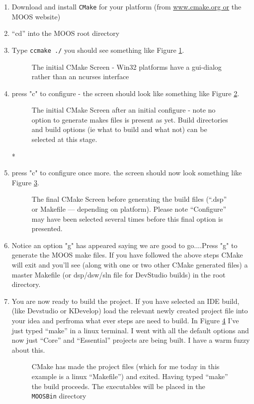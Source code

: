 \documentclass[a4paper,10pt]{article}
\newcommand{\Code}[1]{\texttt{#1} }
\newcommand{\code}[1]{\Code{#1} }
\begin{document}
\begin{enumerate}
\item  Download and install \code{CMake} for your platform (from
\url{www.cmake.org or} the MOOS website)
%
\item ``cd'' into the MOOS root directory
%
\item Type \code{ccmake ./}  you should see
something like Figure \ref{Fig:CMake1}.
\begin{figure}[ht]\label{Fig:CMake1}
\centering {}
\caption{The initial CMake Screen - Win32 platforms have a
gui-dialog rather than an ncurses interface}
\end{figure}
%
\item press "c" to configure - the screen should look like
something like Figure \ref{Fig:CMake2}.
\begin{figure}[ht]\label{Fig:CMake2}
\centering {}
\caption{The initial CMake Screen after an initial configure -
note no option to generate makes files is present as yet. Build
directories and build options (ie what to build and what not) can
be selected at this stage. }
\end{figure}
*
\item press "c" to configure once more. the screen should now look
something like  Figure \ref{Fig:CMake3}.
\begin{figure}[ht]\label{Fig:CMake3}
\centering {}
\caption{The final CMake Screen before generating the build files
(``.dsp'' or Makefile --- depending on platform). Please note
``Configure'' may have been selected several times before this
final option is presented. }
\end{figure}
%
\item Notice an option "g" has appeared saying we are good to
go....Press "g" to generate the MOOS make files. If you have
followed the above steps CMake will exit and you'll see (along
with one or two other CMake generated files) a master Makefile (or dsp/dsw/sln file for DevStudio builds) in
the root directory. 
\item You are now ready to build the project. If you have selected an IDE build, (like Devstudio or KDevelop) load the relevant newly created project file into your idea and perfroma what ever steps are need to build. In Figure \ref{Fig:CMake4} I've just typed ``make'' in a linux
terminal. I went with all the default options and now just ``Core'' and ``Essential'' projects are being built. I have a warm fuzzy about this.
\begin{figure}[ht]\label{Fig:CMake4}
\centering {}
\caption{CMake has made the project files (which for me today in this example is a linux ``Makefile'') and exited. Having typed ``make'' the build proceeds. The executables will be placed in the \code{MOOSBin} directory }
\end{figure}

\end{enumerate}
\end{document}
